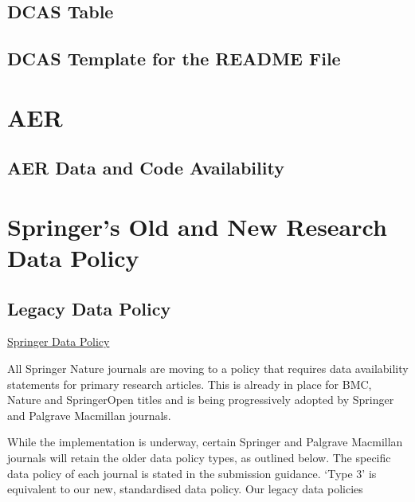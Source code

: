 \documentclass[11pt]{article}
\begin{document}
\subsection{DCAS Table}
\label{dcas_table}


   

\subsection{DCAS Template for the README File}



\section{AER}
\subsection{AER Data and Code Availability}


\section{Springer's Old and New Research Data Policy}
\label{springer}
\subsection{Legacy Data Policy}

\href{https://www.springernature.com/gp/authors/research-data-policy/research-data-policy-types}{Springer Data Policy}

All Springer Nature journals are moving to a policy that requires data availability statements for primary research articles. This is already in place for BMC, Nature and SpringerOpen titles and is being progressively adopted by Springer and Palgrave Macmillan journals.

While the implementation is underway, certain Springer and Palgrave Macmillan journals will retain the older data policy types, as outlined below. The specific data policy of each journal is stated in the submission guidance. ‘Type 3’ is equivalent to our new, standardised data policy.
Our legacy data policies
\end{document}
